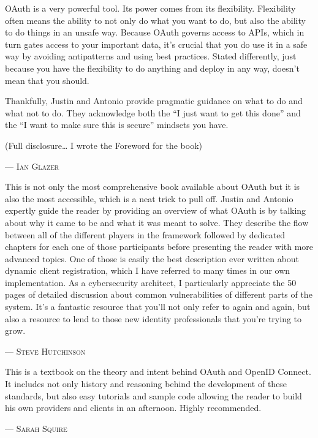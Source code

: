 OAuth is a very powerful tool. Its power comes from its flexibility. Flexibility often means the ability to not only do what you want to do, but also the ability to do things in an unsafe way. Because OAuth governs access to APIs, which in turn gates access to your important data, it’s crucial that you do use it in a safe way by avoiding antipatterns and using best practices. Stated differently, just because you have the flexibility to do anything and deploy in any way, doesn’t mean that you should.

Thankfully, Justin and Antonio provide pragmatic guidance on what to do and what not to do. They acknowledge both the “I just want to get this done” and the “I want to make sure this is secure” mindsets you have.

(Full disclosure… I wrote the Foreword for the book)
\setlength{\parindent}{0cm}\par\textsc{ --- Ian Glazer }\par\vspace{12pt}\setlength{\parindent}{15pt}


This is not only the most comprehensive book available about OAuth but it is also the most accessible, which is a neat trick to pull off. Justin and Antonio expertly guide the reader by providing an overview of what OAuth is by talking about why it came to be and what it was meant to solve. They describe the flow between all of the different players in the framework followed by dedicated chapters for each one of those participants before presenting the reader with more advanced topics. One of those is easily the best description ever written about dynamic client registration, which I have referred to many times in our own implementation. As a cybersecurity architect, I particularly appreciate the 50 pages of detailed discussion about common vulnerabilities of different parts of the system. It’s a fantastic resource that you’ll not only refer to again and again, but also a resource to lend to those new identity professionals that you’re trying to grow. 
\setlength{\parindent}{0cm}\par\textsc{ --- Steve Hutchinson }\par\vspace{12pt}\setlength{\parindent}{15pt}


This is a textbook on the theory and intent behind OAuth and OpenID Connect. It includes not only history and reasoning behind the development of these standards, but also easy tutorials and sample code allowing the reader to build his own providers and clients in an afternoon. Highly recommended. 
\setlength{\parindent}{0cm}\par\textsc{ --- Sarah Squire }\par\vspace{12pt}\setlength{\parindent}{15pt}
